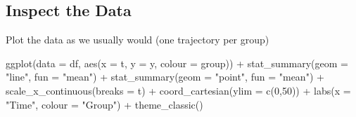 \documentclass[
]{book}
\newenvironment{Shaded}{\begin{snugshade}}{\end{snugshade}}
\newcommand{\AttributeTok}[1]{\textcolor[rgb]{0.77,0.63,0.00}{#1}}
\newcommand{\ControlFlowTok}[1]{\textcolor[rgb]{0.13,0.29,0.53}{\textbf{#1}}}
\newcommand{\DecValTok}[1]{\textcolor[rgb]{0.00,0.00,0.81}{#1}}
\newcommand{\FunctionTok}[1]{\textcolor[rgb]{0.00,0.00,0.00}{#1}}
\newcommand{\NormalTok}[1]{#1}
\newcommand{\OtherTok}[1]{\textcolor[rgb]{0.56,0.35,0.01}{#1}}
\newcommand{\SpecialCharTok}[1]{\textcolor[rgb]{0.00,0.00,0.00}{#1}}
\newcommand{\StringTok}[1]{\textcolor[rgb]{0.31,0.60,0.02}{#1}}
\begin{document}
\begin{Shaded}
\end{Shaded}

\hypertarget{inspect-the-data}{%
\subsection{Inspect the Data}\label{inspect-the-data}}

Plot the data as we usually would (one trajectory per group)

\begin{Shaded}
\begin{Highlighting}[]
\FunctionTok{ggplot}\NormalTok{(}\AttributeTok{data =}\NormalTok{ df, }\FunctionTok{aes}\NormalTok{(}\AttributeTok{x =}\NormalTok{ t, }\AttributeTok{y =}\NormalTok{ y, }\AttributeTok{colour =}\NormalTok{ group)) }\SpecialCharTok{+}
  \FunctionTok{stat\_summary}\NormalTok{(}\AttributeTok{geom =} \StringTok{"line"}\NormalTok{, }\AttributeTok{fun =} \StringTok{"mean"}\NormalTok{) }\SpecialCharTok{+}
  \FunctionTok{stat\_summary}\NormalTok{(}\AttributeTok{geom =} \StringTok{"point"}\NormalTok{, }\AttributeTok{fun =} \StringTok{"mean"}\NormalTok{) }\SpecialCharTok{+}
  \FunctionTok{scale\_x\_continuous}\NormalTok{(}\AttributeTok{breaks =}\NormalTok{ t) }\SpecialCharTok{+}
  \FunctionTok{coord\_cartesian}\NormalTok{(}\AttributeTok{ylim =} \FunctionTok{c}\NormalTok{(}\DecValTok{0}\NormalTok{,}\DecValTok{50}\NormalTok{)) }\SpecialCharTok{+}
  \FunctionTok{labs}\NormalTok{(}\AttributeTok{x =} \StringTok{"Time"}\NormalTok{, }\AttributeTok{colour =} \StringTok{"Group"}\NormalTok{) }\SpecialCharTok{+}
  \FunctionTok{theme\_classic}\NormalTok{()}
\end{Highlighting}
\end{Shaded}
\end{document}
